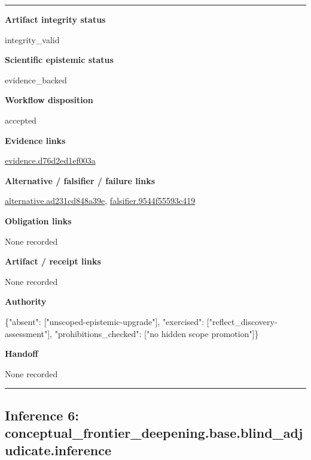 \documentclass[10pt,a4paper]{article}
\newcommand{\TraceField}[2]{\par\noindent\textbf{#1}\par\noindent #2\par\smallskip}
\newenvironment{TraceDossier}{\par\medskip\noindent\hrule\medskip}{\medskip\hrule\par\medskip}
\begin{document}
\begin{TraceDossier}
\TraceField{Artifact integrity status}{integrity\_\allowbreak{}valid}

\TraceField{Scientific epistemic status}{evidence\_\allowbreak{}backed}

\TraceField{Workflow disposition}{accepted}

\TraceField{Evidence links}{\hyperlink{trace-evidence-a913ef1d7171310e61}{evidence.\allowbreak{}d76d2ed1ef\allowbreak{}003a}}

\TraceField{Alternative / falsifier / failure links}{\hyperlink{trace-alternative-2b8c100d716d284ff6}{alternativ\allowbreak{}e.\allowbreak{}ad231cd848\allowbreak{}a39e}, \hyperlink{trace-alternative-b066cd85546166b652}{falsifier.\allowbreak{}9544f55593\allowbreak{}c419}}

\TraceField{Obligation links}{None recorded}

\TraceField{Artifact / receipt links}{None recorded}

\TraceField{Authority}{\{"absent":\allowbreak{} ["unscoped\allowbreak{}-\allowbreak{}epistemic-\allowbreak{}upgrade"],\allowbreak{} "exercised\allowbreak{}":\allowbreak{} ["reflect\_\allowbreak{}discovery-\allowbreak{}assessment\allowbreak{}"], "prohibiti\allowbreak{}ons\_\allowbreak{}checked":\allowbreak{} ["no hidden scope promotion"\allowbreak{}]\}}

\TraceField{Handoff}{None recorded}

\end{TraceDossier}
\pagebreak[2]\subsection{Inference 6: conceptual\allowbreak{}\_\allowbreak{}frontier\_\allowbreak{}deepening.\allowbreak{}base.\allowbreak{}blind\_\allowbreak{}adjudicate\allowbreak{}.\allowbreak{}inference}\label{trace-inference-b68e9f680b8393154b}
\end{document}

